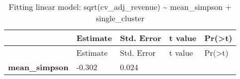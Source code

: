\documentclass[]{article}
\begin{document}
\begin{longtable}[c]{@{}lllll@{}}
\caption{Fitting linear model: sqrt(cv\_adj\_revenue) \textasciitilde{}
mean\_simpson + single\_cluster}\tabularnewline
\toprule
\begin{minipage}[b]{0.31\columnwidth}\raggedright\strut
~
\strut\end{minipage} &
\begin{minipage}[b]{0.13\columnwidth}\raggedright\strut
Estimate
\strut\end{minipage} &
\begin{minipage}[b]{0.16\columnwidth}\raggedright\strut
Std. Error
\strut\end{minipage} &
\begin{minipage}[b]{0.12\columnwidth}\raggedright\strut
t value
\strut\end{minipage} &
\begin{minipage}[b]{0.12\columnwidth}\raggedright\strut
Pr(\textgreater{}\textbar{}t\textbar{})
\strut\end{minipage}\tabularnewline
\midrule
\endfirsthead
\toprule
\begin{minipage}[b]{0.31\columnwidth}\raggedright\strut
~
\strut\end{minipage} &
\begin{minipage}[b]{0.13\columnwidth}\raggedright\strut
Estimate
\strut\end{minipage} &
\begin{minipage}[b]{0.16\columnwidth}\raggedright\strut
Std. Error
\strut\end{minipage} &
\begin{minipage}[b]{0.12\columnwidth}\raggedright\strut
t value
\strut\end{minipage} &
\begin{minipage}[b]{0.12\columnwidth}\raggedright\strut
Pr(\textgreater{}\textbar{}t\textbar{})
\strut\end{minipage}\tabularnewline
\midrule
\endhead
\begin{minipage}[t]{0.31\columnwidth}\raggedright\strut
\textbf{mean\_simpson}
\strut\end{minipage} &
\begin{minipage}[t]{0.13\columnwidth}\raggedright\strut
-0.302
\strut\end{minipage} &
\begin{minipage}[t]{0.16\columnwidth}\raggedright\strut
0.024
\strut\end{minipage} &
\begin{minipage}[t]{0.12\columnwidth}\raggedright\strut

\end{minipage}
\end{longtable}
\end{document}
